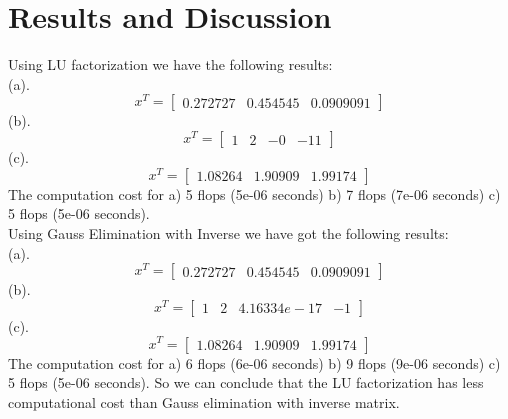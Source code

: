 \documentclass[a4paper, 10pt]{article}
\begin{document}



\section{Results and Discussion}

Using LU factorization we have the following results:\\
(a).\[
       x^T =
       \begin{bmatrix}
       	0.272727 &
       	0.454545 &
       	0.0909091	
       \end{bmatrix}
       \]
(b).\[ x^T =
                    \begin{bmatrix}
                    	1 &	2 & -0 &-11	
                    \end{bmatrix}
                    \]
(c).\[
                           x^T =
                           \begin{bmatrix}
                           	1.08264 &	
                           	1.90909 &
                           	1.99174
                           \end{bmatrix}
                           \]
The computation cost for a) 5 flops (5e-06 seconds) b) 7 flops (7e-06 seconds) c) 5 flops (5e-06 seconds). \\

\noindent Using Gauss Elimination with Inverse we have got the following results:\\
(a).\[
              x^T =
              \begin{bmatrix}
              	0.272727 &	
              	0.454545 &	
              	0.0909091	
              \end{bmatrix}
              \]
(b).\[
              x^T =
              \begin{bmatrix}
              	1 &	
              	2 &
              	4.16334e-17 &	
              	-1	
              \end{bmatrix}
              \]       
(c).\[
              x^T =
              \begin{bmatrix}
              	1.08264 &	
              	1.90909	&
              	1.99174	
              \end{bmatrix}
              \]
The computation cost for a) 6 flops (6e-06 seconds) b) 9 flops (9e-06 seconds) c) 5 flops (5e-06 seconds). So we can conclude that the LU factorization has less computational cost than Gauss elimination with inverse matrix. 
\end{document}

